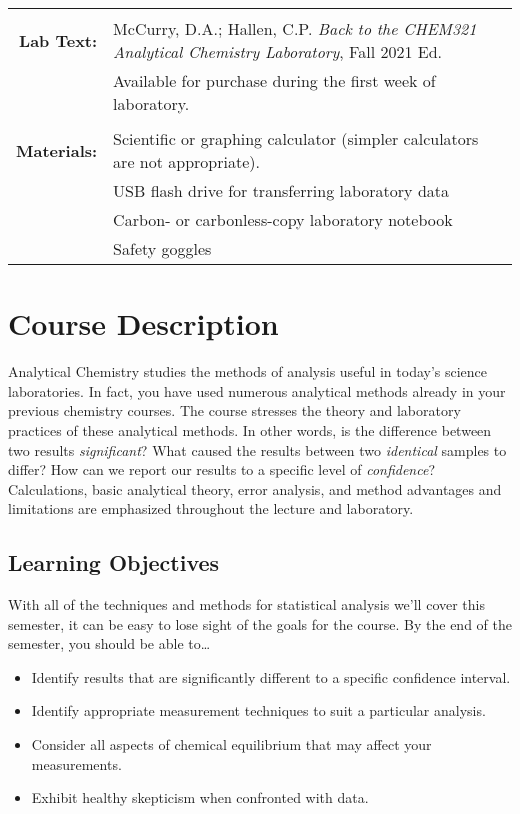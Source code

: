 \documentclass[11pt,letterpaper]{article}
\begin{document}
\begin{tabularx}{\linewidth} {@{\qquad}>{\bfseries\sffamily}r
	>{\raggedright\arraybackslash}X@{\qquad}}
	      \\ \\
	Lab Text: & McCurry, D.A.; Hallen, C.P. \textit{Back to the CHEM321
	Analytical Chemistry Laboratory}, Fall 2021 Ed. \\
	       	      & \footnotesize Available for purchase during the first
		      week of laboratory. \\ \\
	Materials: & Scientific or graphing calculator (simpler calculators
	are not appropriate). \\
		   & USB flash drive for transferring laboratory data \\
		   & Carbon- or carbonless-copy laboratory notebook \\
		   & Safety goggles \\
	\bottomrule
\end{tabularx}

\section{Course Description}
Analytical Chemistry studies the methods of analysis useful in today's science
laboratories. In fact, you have used numerous analytical methods already in your
previous chemistry courses. The course stresses the theory and laboratory
practices of these analytical methods. In other words, is the difference between
two results \emph{significant}? What caused the results between two
\emph{identical} samples to differ? How can we report our results to a specific
level of \emph{confidence}? Calculations, basic analytical theory, error
analysis, and method advantages and limitations are emphasized throughout the
lecture and laboratory.

\subsection{Learning Objectives}
With all of the techniques and methods for statistical analysis we'll cover this
semester, it can be easy to lose sight of the goals for the course. By the end
of the semester, you should be able to\ldots
\begin{itemize}[noitemsep]
	\item Identify results that are significantly different to a specific
		confidence interval.
	\item Identify appropriate measurement techniques to suit a particular
		analysis.
	\item Consider all aspects of chemical equilibrium that may affect your
		measurements.
	\item Exhibit healthy skepticism when confronted with data.
\end{itemize}
\end{document}
